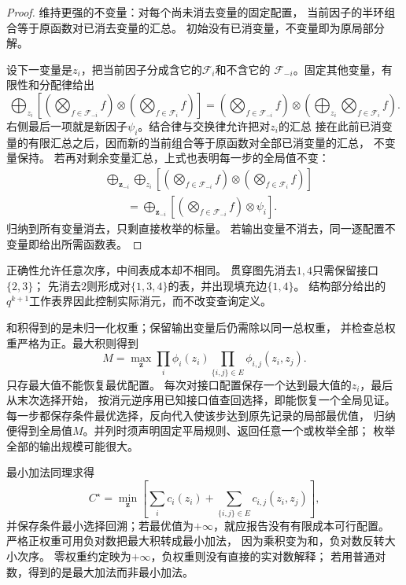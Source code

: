 \begin{proof}
维持更强的不变量：对每个尚未消去变量的固定配置，
当前因子的半环组合等于原函数对已消去变量的汇总。
初始没有已消变量，不变量即为原局部分解。

设下一变量是\(z_i\)，把当前因子分成含它的\(\mathcal F_i\)和不含它的
\(\mathcal F_{-i}\)。固定其他变量，有限性和分配律给出
\[
  \bigoplus_{z_i}
  \left[
    \left(\bigotimes_{f\in\mathcal F_{-i}}f\right)
    \otimes\left(\bigotimes_{f\in\mathcal F_i}f\right)
  \right]
  =
  \left(\bigotimes_{f\in\mathcal F_{-i}}f\right)
  \otimes\left(\bigoplus_{z_i}\bigotimes_{f\in\mathcal F_i}f\right).
\]
右侧最后一项就是新因子\(\psi_i\)。结合律与交换律允许把对\(z_i\)的汇总
接在此前已消变量的有限汇总之后，因而新的当前组合等于原函数对全部已消变量的汇总，
不变量保持。
若再对剩余变量汇总，上式也表明每一步的全局值不变：
\begin{align*}
  &\bigoplus_{\bm z_{-i}}\bigoplus_{z_i}
    \left[\left(\bigotimes_{f\in\mathcal F_{-i}}f\right)
       \otimes\left(\bigotimes_{f\in\mathcal F_i}f\right)\right]\\
  &\qquad=\bigoplus_{\bm z_{-i}}
    \left[\left(\bigotimes_{f\in\mathcal F_{-i}}f\right)\otimes\psi_i\right].
\end{align*}
归纳到所有变量消去，只剩直接枚举的标量。
若输出变量不消去，同一逐配置不变量即给出所需函数表。
\end{proof}

正确性允许任意次序，中间表成本却不相同。
贯穿图先消去\(1,4\)只需保留接口\(\{2,3\}\)；
先消去\(2\)则形成对\(\{1,3,4\}\)的表，并出现填充边\(\{1,4\}\)。
结构部分给出的\(q^{k+1}\)工作表界因此控制实际消元，而不改变查询定义。

和积得到的是未归一化权重；保留输出变量后仍需除以同一总权重，
并检查总权重严格为正。最大积则得到
\[
  M=\max_{\bm z}\prod_i\phi_i(z_i)
        \prod_{\{i,j\}\in E}\phi_{i,j}(z_i,z_j).
\]
只存最大值不能恢复最优配置。
每次对接口配置保存一个达到最大值的\(z_i\)，最后从末次选择开始，
按消元逆序用已知接口值查回选择，即能恢复一个全局见证。
每一步都保存条件最优选择，反向代入使该步达到原先记录的局部最优值，
归纳便得到全局值\(M\)。并列时须声明固定平局规则、返回任意一个或枚举全部；
枚举全部的输出规模可能很大。

最小加法同理求得
\[
  C^\star=\min_{\bm z}
    \left[\sum_i c_i(z_i)+\sum_{\{i,j\}\in E}c_{i,j}(z_i,z_j)\right],
\]
并保存条件最小选择回溯；若最优值为\(+\infty\)，就应报告没有有限成本可行配置。
严格正权重可用负对数把最大积转成最小加法，
因为乘积变为和，负对数反转大小次序。
零权重约定映为\(+\infty\)，负权重则没有直接的实对数解释；
若用普通对数，得到的是最大加法而非最小加法。

